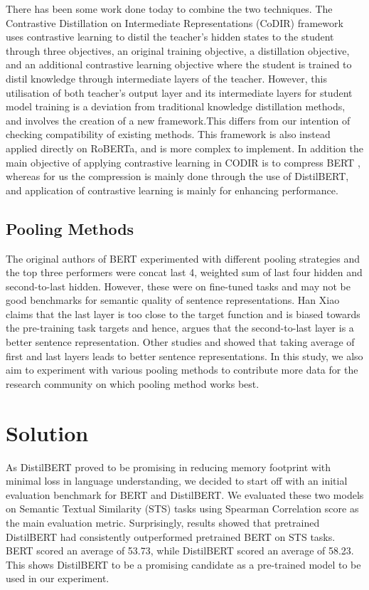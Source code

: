 \documentclass[10pt,twocolumn,letterpaper]{article}
\begin{document}
There has been some work done today to combine the two techniques.  The Contrastive Distillation on Intermediate Representations (CoDIR) framework \cite{2009.14167} uses contrastive learning to distil the teacher’s hidden states to the student through three objectives, an original training objective, a  distillation objective, and an additional contrastive learning objective where the student is trained to distil knowledge through intermediate layers of the teacher. However, this utilisation of both teacher’s output layer and its intermediate layers for student model training is a deviation from traditional knowledge distillation methods, and involves the creation of a new framework.This differs from our intention of checking compatibility of existing methods.  This framework is also instead applied directly on RoBERTa,  and is more complex to implement.  In addition the main objective of applying contrastive learning in CODIR is to compress BERT \cite{2009.14167}, whereas for us the compression is mainly done through the use of DistilBERT, and application of contrastive learning is mainly for enhancing performance.

\subsection{Pooling Methods}

The original authors of BERT \cite{1810.04805} experimented with different pooling strategies and the top three performers were concat last 4, weighted sum of last four hidden and second-to-last hidden. However, these were on fine-tuned tasks and may not be good benchmarks for semantic quality of sentence representations. Han Xiao \cite{bert.as.service} claims that the last layer is too close to the target function and is biased towards the pre-training task targets and hence, argues that the second-to-last layer is a better sentence representation. Other studies \cite{li-etal-2020-sentence} and  \cite{https://doi.org/10.48550/arxiv.1908.10084} showed that taking average of first and last layers leads to better sentence representations. In this study, we also aim to experiment with various pooling methods to contribute more data for the research community on which pooling method works best.

\section{Solution}

As DistilBERT proved to be promising in reducing memory footprint with minimal loss in language understanding, we decided to start off with an initial evaluation benchmark for BERT and DistilBERT. We evaluated these two models on Semantic Textual Similarity (STS) tasks using Spearman Correlation score as the main evaluation metric. Surprisingly, results showed that pretrained DistilBERT had consistently outperformed pretrained BERT on STS tasks. BERT scored an average of 53.73, while DistilBERT scored an average of 58.23. This shows DistilBERT to be a promising candidate as a pre-trained model to be used in our experiment.
\end{document}
